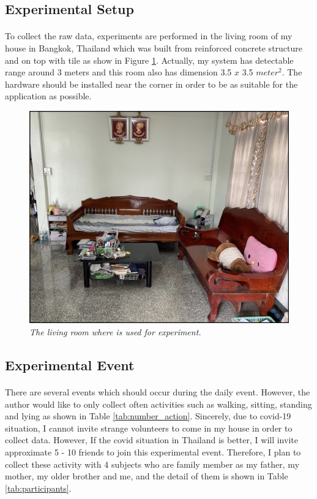 \subsection{Experimental Setup}
\paragraph{}
To collect the raw data, experiments are performed in the living room of my house in Bangkok, Thailand which was built from reinforced concrete structure and on top with tile as show in Figure \ref{fig:home}. Actually, my system has detectable range around 3 meters and this room also has dimension 3.5 $x$ 3.5 $meter^2$. The hardware should be  installed near the corner in order to be as suitable for the application as possible.

\begin{figure}[H]
  \centering
  \caption[The living room where is used for experiment]{\emph{The living room where is used for experiment.}}\label{fig:home}
  \includegraphics[scale = 0.2]{figures/home.jpg}  
\end{figure}

\subsection{Experimental Event}
\paragraph{}
There are several events which should occur during the daily event. However, the author would like to only collect often activities such as walking, sitting, standing and lying as shown in Table \ref{tab:number_action}. Sincerely, due to covid-19 situation, I cannot invite strange volunteers to come in my house in order to collect data. However, If the covid situation in Thailand is better, I will invite approximate 5 - 10 friends to join this experimental event. Therefore, I plan to collect these activity with 4 subjects who are family member as my father, my mother, my older brother and me, and the detail of them is shown in Table \ref{tab:participants}.

